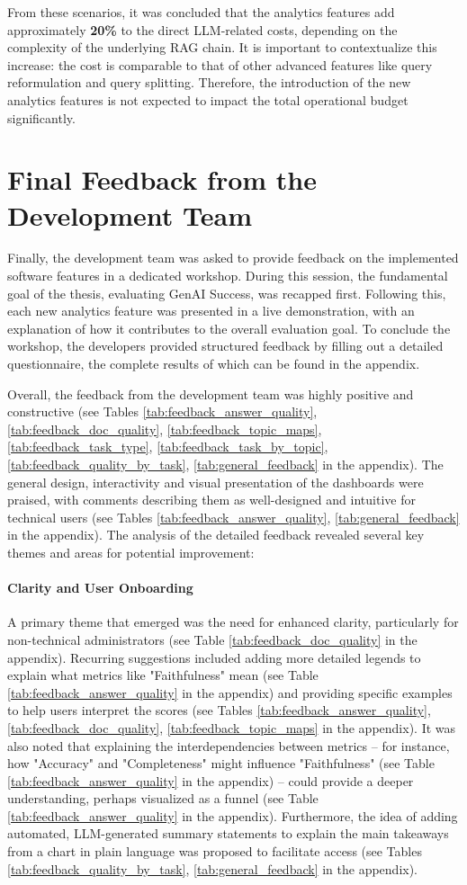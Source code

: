 \documentclass[
	english,
	ruledheaders=section,%
	class=report,%
	thesis={type=bachelor},%
	accentcolor=1b,%
	custommargins=true,%
	marginpar=false,%
	parskip=half-,%
	fontsize=11pt,%
	DIV=14,
]{tudapub}
\begin{document}
From these scenarios, it was concluded that the analytics features add approximately \textbf{20\%} to the direct LLM-related costs, depending on the complexity of the underlying RAG chain. It is important to contextualize this increase: the cost is comparable to that of other advanced features like query reformulation and query splitting. Therefore, the introduction of the new analytics features is not expected to impact the total operational budget significantly.
\section{Final Feedback from the Development Team}
Finally, the development team was asked to provide feedback on the implemented software features in a dedicated workshop. During this session, the fundamental goal of the thesis, evaluating GenAI Success, was recapped first. Following this, each new analytics feature was presented in a live demonstration, with an explanation of how it contributes to the overall evaluation goal. To conclude the workshop, the developers provided structured feedback by filling out a detailed questionnaire, the complete results of which can be found in the appendix.

Overall, the feedback from the development team was highly positive and constructive (see Tables \ref{tab:feedback_answer_quality}, \ref{tab:feedback_doc_quality}, \ref{tab:feedback_topic_maps}, \ref{tab:feedback_task_type}, \ref{tab:feedback_task_by_topic}, \ref{tab:feedback_quality_by_task}, \ref{tab:general_feedback} in the appendix). The general design, interactivity and visual presentation of the dashboards were praised, with comments describing them as well-designed and intuitive for technical users (see Tables \ref{tab:feedback_answer_quality}, \ref{tab:general_feedback} in the appendix). The analysis of the detailed feedback revealed several key themes and areas for potential improvement:

\paragraph{Clarity and User Onboarding} A primary theme that emerged was the need for enhanced clarity, particularly for non-technical administrators (see Table \ref{tab:feedback_doc_quality} in the appendix). Recurring suggestions included adding more detailed legends to explain what metrics like "Faithfulness" mean (see Table \ref{tab:feedback_answer_quality} in the appendix) and providing specific examples to help users interpret the scores (see Tables \ref{tab:feedback_answer_quality}, \ref{tab:feedback_doc_quality}, \ref{tab:feedback_topic_maps} in the appendix). It was also noted that explaining the interdependencies between metrics -- for instance, how "Accuracy" and "Completeness" might influence "Faithfulness" (see Table \ref{tab:feedback_answer_quality} in the appendix) -- could provide a deeper understanding, perhaps visualized as a funnel (see Table \ref{tab:feedback_answer_quality} in the appendix). Furthermore, the idea of adding automated, LLM-generated summary statements to explain the main takeaways from a chart in plain language was proposed to facilitate access (see Tables \ref{tab:feedback_quality_by_task}, \ref{tab:general_feedback} in the appendix).
\end{document}
